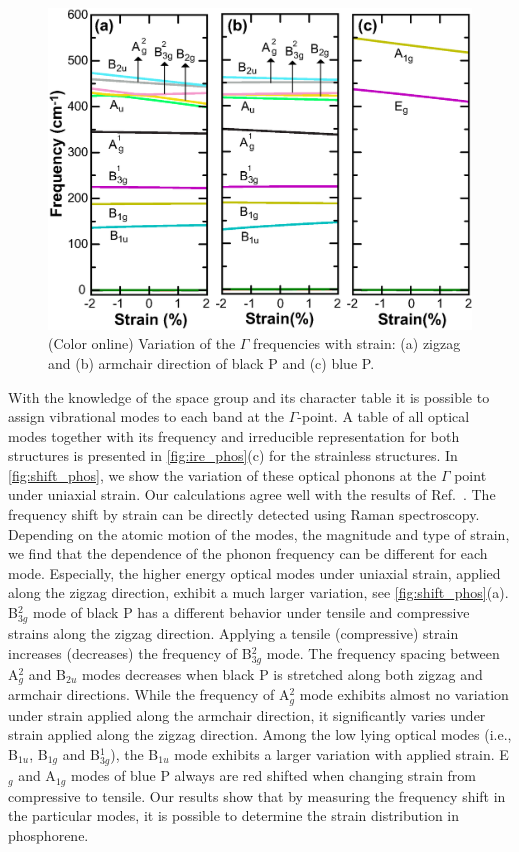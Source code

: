 \begin{figure}[htbp]
\centering
\includegraphics[width=0.8\linewidth]{strain_vib.eps}%
\caption{ (Color online) Variation of the $\Gamma$ frequencies with strain: (a) zigzag and (b) armchair direction of black P and (c) blue P.  \label{fig:shift_phos} }
\end{figure}

With the knowledge of the space group and its character table it is possible to assign vibrational modes to each band at the $\Gamma$-point. A table of all optical modes together with its frequency and irreducible representation for both structures is presented in \autoref{fig:ire_phos}(c) for the strainless structures. In \autoref{fig:shift_phos}, we show the variation of these optical phonons at the $\Gamma$ point under uniaxial strain. Our calculations agree well with the results of Ref.~\cite{phonon-blackP-1}. The frequency shift by strain can be directly detected using Raman spectroscopy. 
Depending on the atomic motion of the modes, the magnitude and type of strain, we find that the dependence of the phonon frequency can be different for each mode. Especially, the higher energy optical modes under uniaxial strain, applied along the zigzag direction, exhibit a much larger variation, see \autoref{fig:shift_phos}(a). B$^2_{3g}$ mode of black P has a different behavior under tensile and compressive strains along the zigzag direction. Applying a tensile (compressive) strain increases (decreases) the frequency of B$^2_{3g}$ mode. The frequency spacing between A$^2_{g}$ and B$_{2u}$ modes decreases when black P is stretched along both zigzag and armchair directions. While  the frequency of A$^2_{g}$ mode exhibits almost no variation under strain applied along the armchair direction,  it significantly varies under  strain applied along the zigzag direction.
Among the low lying optical modes (i.e., B$_{1u}$, B$_{1g}$ and B$^1_{3g}$), the B$_{1u}$ mode exhibits a larger variation with applied strain. 
E$_g$ and A$_{1g}$ modes of blue P always are red shifted when changing strain from compressive to tensile. Our results show that by measuring the frequency shift in the particular modes, it is possible to determine the
strain distribution in phosphorene.  

